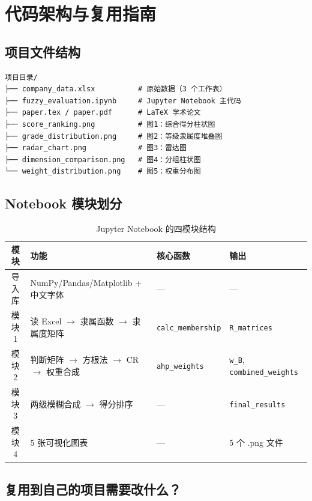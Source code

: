 \documentclass[a4paper,11pt]{ctexart}
\begin{document}
\section{代码架构与复用指南}

\subsection{项目文件结构}

\begin{verbatim}
项目目录/
├── company_data.xlsx          # 原始数据（3 个工作表）
├── fuzzy_evaluation.ipynb     # Jupyter Notebook 主代码
├── paper.tex / paper.pdf      # LaTeX 学术论文
├── score_ranking.png          # 图1：综合得分柱状图
├── grade_distribution.png     # 图2：等级隶属度堆叠图
├── radar_chart.png            # 图3：雷达图
├── dimension_comparison.png   # 图4：分组柱状图
└── weight_distribution.png    # 图5：权重分布图
\end{verbatim}

\subsection{Notebook 模块划分}

\begin{table}[H]
\centering
\caption{Jupyter Notebook 的四模块结构}
\begin{tabular}{clll}
\toprule
\textbf{模块} & \textbf{功能} & \textbf{核心函数} & \textbf{输出} \\
\midrule
导入库 & NumPy/Pandas/Matplotlib + 中文字体 & — & — \\
模块 1 & 读 Excel $\to$ 隶属函数 $\to$ 隶属度矩阵 & \texttt{calc\_membership} & \texttt{R\_matrices} \\
模块 2 & 判断矩阵 $\to$ 方根法 $\to$ CR $\to$ 权重合成 & \texttt{ahp\_weights} & \texttt{w\_B}, \texttt{combined\_weights} \\
模块 3 & 两级模糊合成 $\to$ 得分排序 & — & \texttt{final\_results} \\
模块 4 & 5 张可视化图表 & — & 5 个 .png 文件 \\
\bottomrule
\end{tabular}
\end{table}

\subsection{复用到自己的项目需要改什么？}
\end{document}
